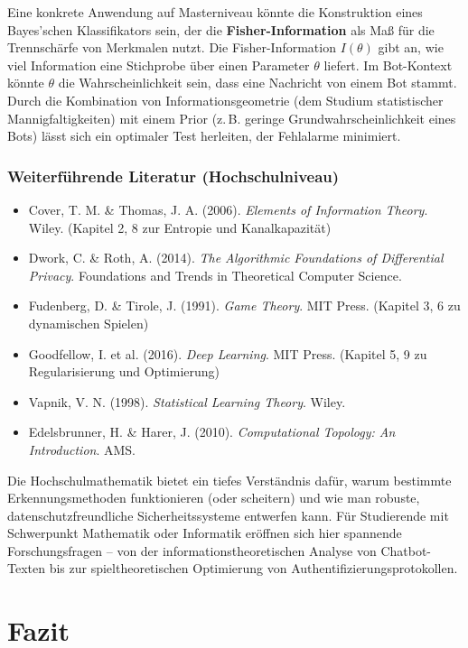\documentclass[12pt,a4paper,oneside]{scrartcl}
\begin{document}
	Eine konkrete Anwendung auf Masterniveau könnte die Konstruktion eines Bayes’schen Klassifikators sein, der die \textbf{Fisher-Information} als Maß für die Trennschärfe von Merkmalen nutzt. Die Fisher-Information $I(\theta)$ gibt an, wie viel Information eine Stichprobe über einen Parameter $\theta$ liefert. Im Bot-Kontext könnte $\theta$ die Wahrscheinlichkeit sein, dass eine Nachricht von einem Bot stammt. Durch die Kombination von Informationsgeometrie (dem Studium statistischer Mannigfaltigkeiten) mit einem Prior (z.\,B. geringe Grundwahrscheinlichkeit eines Bots) lässt sich ein optimaler Test herleiten, der Fehlalarme minimiert.
	
	\subsubsection{Weiterführende Literatur (Hochschulniveau)}
	
	\begin{itemize}
		\item Cover, T. M. \& Thomas, J. A. (2006). \textit{Elements of Information Theory}. Wiley. (Kapitel 2, 8 zur Entropie und Kanalkapazität)
		\item Dwork, C. \& Roth, A. (2014). \textit{The Algorithmic Foundations of Differential Privacy}. Foundations and Trends in Theoretical Computer Science.
		\item Fudenberg, D. \& Tirole, J. (1991). \textit{Game Theory}. MIT Press. (Kapitel 3, 6 zu dynamischen Spielen)
		\item Goodfellow, I. et al. (2016). \textit{Deep Learning}. MIT Press. (Kapitel 5, 9 zu Regularisierung und Optimierung)
		\item Vapnik, V. N. (1998). \textit{Statistical Learning Theory}. Wiley.
		\item Edelsbrunner, H. \& Harer, J. (2010). \textit{Computational Topology: An Introduction}. AMS.
	\end{itemize}
	
	Die Hochschulmathematik bietet ein tiefes Verständnis dafür, warum bestimmte Erkennungsmethoden funktionieren (oder scheitern) und wie man robuste, datenschutzfreundliche Sicherheitssysteme entwerfen kann. Für Studierende mit Schwerpunkt Mathematik oder Informatik eröffnen sich hier spannende Forschungsfragen – von der informationstheoretischen Analyse von Chatbot-Texten bis zur spieltheoretischen Optimierung von Authentifizierungsprotokollen.
	
	\section{Fazit}
	
\end{document}
